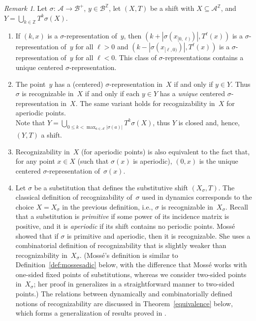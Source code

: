 \documentclass{amsart}
\theoremstyle{definition}
\theoremstyle{remark}
\newtheorem{remark}[lemma]{Remark}
\numberwithin{equation}{section}
\begin{document}
\begin{remark}\label{rem:sigma}
Let $\sigma:\, \mathcal{A} \to \mathcal{B}^+$, $y \in \mathcal{B}^\mathbb{Z}$, let $(X,T)$ be a shift with $X \subseteq \mathcal{A}^\mathbb{Z}$, and $Y = \bigcup_{k \in \mathbb{Z}} T^k \sigma(X)$.
\begin{enumerate}
\itemsep.5ex
\item
If $(k,x)$ is a $\sigma$-representation of~$y$, then $(k+|\sigma(x_{[0,\ell)})|, T^\ell(x))$ is a $\sigma$-representation of~$y$ for all $\ell > 0$ and $(k-|\sigma(x_{[\ell,0)})|, T^\ell(x))$ is a $\sigma$-representation of~$y$ for all $\ell < 0$.
This class of $\sigma$-representations contains a unique centered $\sigma$-representation.

\item 
The point~$y$ has a (centered) $\sigma$-representation in~$X$ if and only if $y \in Y$. 
Thus $\sigma$ is recognizable in~$X$ if and only if each $y \in Y$ has a \emph{unique} centered $\sigma$-representation in~$X$. 
The same variant holds for recognizability in~$X$ for aperiodic points. \\
Note that $Y = \bigcup_{0 \le k < \max_{a\in\mathcal{A}}|\sigma(a)|} T^k \sigma(X)$, thus $Y$ is closed and, hence, $(Y, T)$ a shift. 

\item 
Recognizability in~$X$ (for aperiodic points) is also equivalent to the fact that, for any point $x \in X$ (such that $\sigma(x)$ is aperiodic), $(0,x)$ is the unique centered $\sigma$-representation of~$\sigma(x)$.
 
\item 
Let $\sigma$ be a substitution that defines the substitutive shift $(X_\sigma,T)$. The classical definition of  recognizability of~$\sigma$ used in dynamics  corresponds to the choice $X=X_{\sigma}$ in the previous definition, i.e., $\sigma$ is recognizable in~$X_\sigma$. Recall that a substitution is \emph{primitive} if some power of its incidence matrix is positive, and it is \emph{aperiodic} if its shift contains no periodic points. 
Moss\'{e} \cite{Mosse:92,Mosse:96} showed that if $\sigma$ is primitive and aperiodic, then it is recognizable. 
She uses a combinatorial definition of recognizability that is slightly weaker than recognizability in~$X_\sigma$. (Moss\'{e}'s definition is similar to Definition~\ref{def:mossesadic} below, with the difference that Moss\'{e} works with one-sided fixed points of substitutions, whereas we consider two-sided points in~$X_\sigma$; her proof  in \cite{Mosse:92,Mosse:96} generalizes in a straightforward manner to two-sided points.) The relations between dynamically and combinatorially defined notions of recognizability are discussed in Theorem~\ref{equivalence} below, which forms a generalization of results proved in \cite{Host:1986,Queffelec:10}. 


\end{enumerate}
\end{remark}
\end{document}
